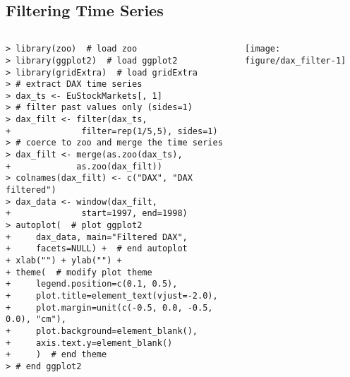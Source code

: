 \documentclass[10pt]{beamer}\usepackage[]{graphicx}\usepackage[]{color}
\makeatletter
\newenvironment{kframe}{%
 \def\at@end@of@kframe{}%
 \ifinner\ifhmode%
  \def\at@end@of@kframe{\end{minipage}}%
  \begin{minipage}{\columnwidth}%
 \fi\fi%
 \def\FrameCommand##1{\hskip\@totalleftmargin \hskip-\fboxsep
 \colorbox{shadecolor}{##1}\hskip-\fboxsep
     \hskip-\linewidth \hskip-\@totalleftmargin \hskip\columnwidth}%
 \MakeFramed {\advance\hsize-\width
   \@totalleftmargin\z@ \linewidth\hsize
   \@setminipage}}%
 {\par\unskip\endMakeFramed%
 \at@end@of@kframe}
\newenvironment{knitrout}{}{} %
\makeatother
\begin{document}
\subsection{Filtering Time Series}
\begin{frame}[fragile,t]{\subsecname}
\vspace{-1em}
\begin{block}{}
  \begin{columns}[T]
      \vspace{-1em}
\begin{knitrout}\scriptsize
{}\color{fgcolor}\begin{kframe}
\begin{verbatim}
> library(zoo)  # load zoo
> library(ggplot2)  # load ggplot2
> library(gridExtra)  # load gridExtra
> # extract DAX time series
> dax_ts <- EuStockMarkets[, 1]
> # filter past values only (sides=1)
> dax_filt <- filter(dax_ts,
+              filter=rep(1/5,5), sides=1)
> # coerce to zoo and merge the time series
> dax_filt <- merge(as.zoo(dax_ts),
+             as.zoo(dax_filt))
> colnames(dax_filt) <- c("DAX", "DAX filtered")
> dax_data <- window(dax_filt,
+              start=1997, end=1998)
> autoplot(  # plot ggplot2
+     dax_data, main="Filtered DAX",
+     facets=NULL) +  # end autoplot
+ xlab("") + ylab("") +
+ theme(  # modify plot theme
+     legend.position=c(0.1, 0.5),
+     plot.title=element_text(vjust=-2.0),
+     plot.margin=unit(c(-0.5, 0.0, -0.5, 0.0), "cm"),
+     plot.background=element_blank(),
+     axis.text.y=element_blank()
+     )  # end theme
> # end ggplot2
\end{verbatim}
\end{kframe}
\end{knitrout}
      \hspace*{-1em}
      \texttt{[image: figure/dax\_filter-1]}
  \end{columns}
\end{block}

\end{frame}


\end{document}
